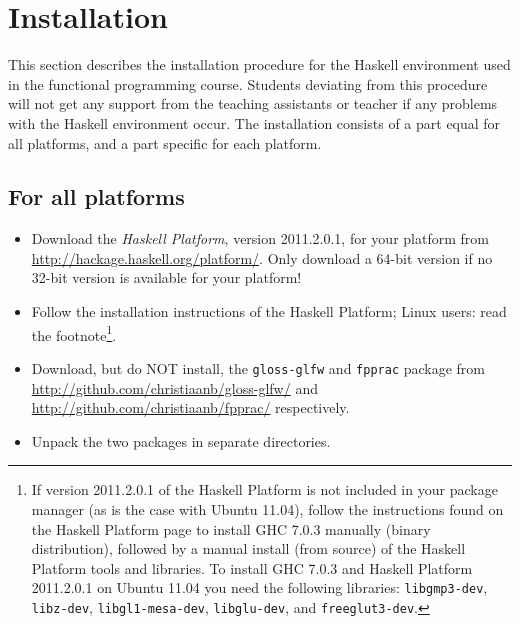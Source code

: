 \documentclass[]{article}
\begin{document}
\section{Installation}
This section describes the installation procedure for the Haskell environment used in the functional programming course. Students deviating from this procedure will not get any support from the teaching assistants or teacher if any problems with the Haskell environment occur.
The installation consists of a part equal for all platforms, and a part specific for each platform.

\subsection{For all platforms}
\begin{itemize}
  \item Download the \emph{Haskell Platform}, version 2011.2.0.1, for your platform from \url{http://hackage.haskell.org/platform/}. Only download a 64-bit version if no 32-bit version is available for your platform! 
  \item Follow the installation instructions of the Haskell Platform; Linux users: read the footnote\footnote{If version 2011.2.0.1 of the Haskell Platform is not included in your package manager (as is the case with Ubuntu 11.04), follow the instructions found on the Haskell Platform page to install GHC 7.0.3 manually (binary distribution), followed by a manual install (from source) of the Haskell Platform tools and libraries.
To install GHC 7.0.3 and Haskell Platform 2011.2.0.1 on Ubuntu 11.04 you need the following libraries: \texttt{libgmp3-dev}, \texttt{libz-dev}, \texttt{libgl1-mesa-dev}, \texttt{libglu-dev}, and \texttt{freeglut3-dev}.}.
  \item Download, but do NOT install, the \texttt{gloss-glfw} and \texttt{fpprac} package from \url{http://github.com/christiaanb/gloss-glfw/} and \url{http://github.com/christiaanb/fpprac/} respectively.
  \item Unpack the two packages in separate directories.
\end{itemize}
\end{document}
